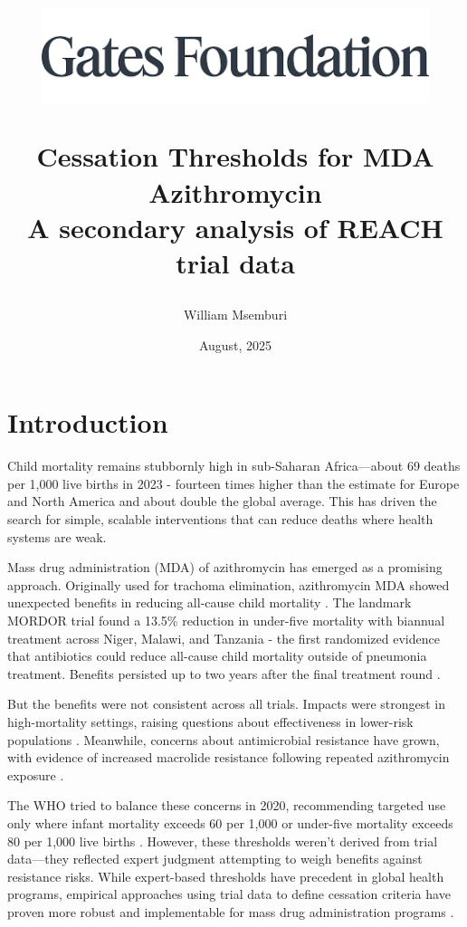 \documentclass[11pt]{article}\usepackage[]{graphicx}\usepackage[]{xcolor}
\title{
\begin{center}
\includegraphics[width=0.85\textwidth]{utils/LOGO.png}
\end{center}

\vspace{5mm}

Cessation Thresholds for MDA Azithromycin \\
\Large A secondary analysis of REACH trial data}
\author{William Msemburi}
\date{August, 2025}
\begin{document}
\maketitle
\thispagestyle{empty}



\clearpage

\section{Introduction}

Child mortality remains stubbornly high in sub-Saharan Africa---about 69 deaths per 1,000 live births in 2023 \citep{UNIGME2024} - fourteen times higher than the estimate for Europe and North America and about double the global average. This has driven the search for simple, scalable interventions that can reduce deaths where health systems are weak.

Mass drug administration (MDA) of azithromycin has emerged as a promising approach. Originally used for trachoma elimination, azithromycin MDA showed unexpected benefits in reducing all-cause child mortality \citep{keenan2018nejm}. The landmark MORDOR trial found a 13.5\% reduction in under-five mortality with biannual treatment across Niger, Malawi, and Tanzania - the first randomized evidence that antibiotics could reduce all-cause child mortality outside of pneumonia treatment. Benefits persisted up to two years after the final treatment round \citep{keenan2019nejm}.

But the benefits were not consistent across all trials. Impacts were strongest in high-mortality settings, raising questions about effectiveness in lower-risk populations \citep{oron2020ajtmh}. Meanwhile, concerns about antimicrobial resistance have grown, with evidence of increased macrolide resistance following repeated azithromycin exposure \citep{kalizang2025long}.

The WHO tried to balance these concerns in 2020, recommending targeted use only where infant mortality exceeds 60 per 1,000 or under-five mortality exceeds 80 per 1,000 live births \citep{who2020guidelines}. However, these thresholds weren't derived from trial data—they reflected expert judgment attempting to weigh benefits against resistance risks. While expert-based thresholds have precedent in global health programs, empirical approaches using trial data to define cessation criteria have proven more robust and implementable for mass drug administration programs \citep{jimenez2015mass, mahmud2021stopping, sharma2023evaluating}.
\end{document}
